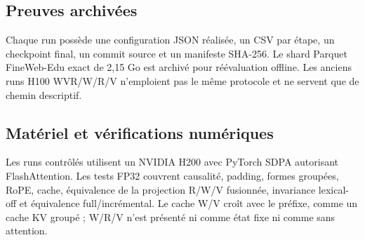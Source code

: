 \subsection{Preuves archivées}

Chaque run possède une configuration JSON réalisée, un CSV par étape, un checkpoint final, un commit source et un manifeste SHA-256. Le shard Parquet FineWeb-Edu exact de 2,15 Go est archivé pour réévaluation offline. Les anciens runs H100 WVR/W/R/V n'emploient pas le même protocole et ne servent que de chemin descriptif.

\subsection{Matériel et vérifications numériques}

Les runs contrôlés utilisent un NVIDIA H200 avec PyTorch SDPA autorisant FlashAttention. Les tests FP32 couvrent causalité, padding, formes groupées, RoPE, cache, équivalence de la projection R/W/V fusionnée, invariance lexical-off et équivalence full/incrémental. Le cache W/V croît avec le préfixe, comme un cache KV groupé ; W/R/V n'est présenté ni comme état fixe ni comme sans attention.